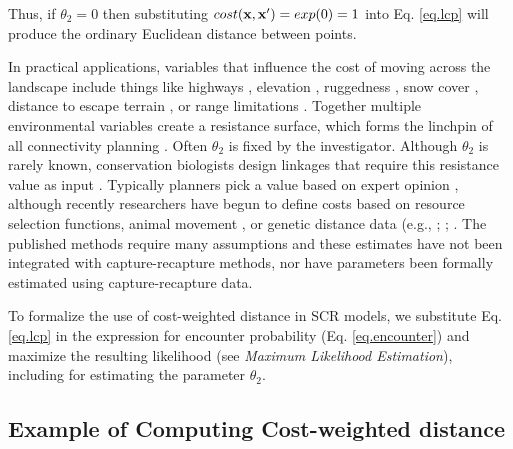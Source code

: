 \documentclass[12pt]{article}
\begin{document}
\begin{spacing}{1.8}
{\flushleft
Thus,} if $\theta_{2} = 0$ then substituting $cost({\bf x},{\bf x}')
=exp(0) = 1$ into
Eq. \ref{eq.lcp} will produce the ordinary Euclidean distance
between points.

In practical applications, variables that influence the cost of moving
across the landscape include things like highways
\citep[e.g.,][]{epps_etal:2005}, elevation \citep{cushman_etal:2006},
ruggedness \citep{epps_etal:2007}, snow cover
\citep{schwartz_etal:2009}, distance to escape terrain
\citep{shirk_etal:2010}, or range limitations
\citep{mcrae_beier:2007}.  Together multiple environmental variables
create a resistance surface, which forms the linchpin of all
connectivity planning \citep{spear_etal:2010}.  Often $\theta_{2}$ is
fixed by the investigator. Although $\theta_{2}$ is rarely known,
conservation biologists design linkages that require this resistance
value as input \citep[see][and articles cited
therein]{beier_etal:2008}.  Typically planners pick a value based on
expert opinion \citep{beier_etal:2008}, although recently researchers
have begun to define costs based on resource selection functions,
animal movement \citep{tracy:2006, fortin_etal:2005}, or genetic
distance data (e.g., \citet{gerlach_musolf:2000};
\citet{epps_etal:2007}; \citet{schwartz_etal:2009}. The published
methods require many assumptions and these estimates have not been
integrated with capture-recapture methods, nor have parameters been
formally estimated using capture-recapture data.

To formalize the use of cost-weighted distance in SCR models, we
substitute Eq. \ref{eq.lcp} in the expression for encounter
probability (Eq. \ref{eq.encounter}) and maximize the resulting
likelihood (see {\it Maximum Likelihood Estimation}), including for estimating the
parameter $\theta_{2}$.


\subsection{Example of Computing Cost-weighted distance}


\end{spacing}
\end{document}
